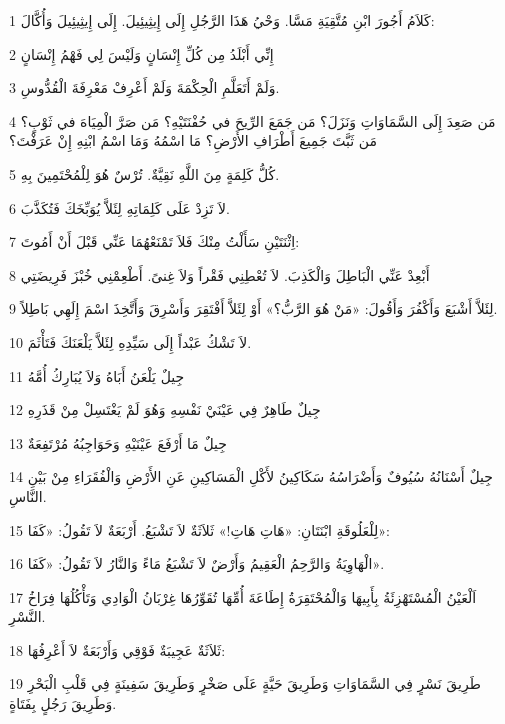\par 1 كَلاَمُ أَجُورَ ابْنِ مُتَّقِيَةِ مَسَّا. وَحْيُ هَذَا الرَّجُلِ إِلَى إِيثِيئِيلَ. إِلَى إِيثِيئِيلَ وَأُكَّالَ:
\par 2 إِنِّي أَبْلَدُ مِن كُلِّ إِنْسَانٍ وَلَيْسَ لِي فَهْمُ إِنْسَانٍ
\par 3 وَلَمْ أَتَعَلَّمِ الْحِكْمَةَ وَلَمْ أَعْرِفْ مَعْرِفَةَ الْقُدُّوسِ.
\par 4 مَن صَعِدَ إِلَى السَّمَاوَاتِ وَنَزَلَ؟ مَن جَمَعَ الرِّيحَ في حُفْنَتَيْهِ؟ مَن صَرَّ الْمِيَاهَ في ثَوْبٍ؟ مَن ثَبَّتَ جَمِيعَ أَطْرَافِ الأَرْضِ؟ مَا اسْمُهُ وَمَا اسْمُ ابْنِهِ إِنْ عَرَفْتَ؟
\par 5 كُلُّ كَلِمَةٍ مِنَ اللَّهِ نَقِيَّةٌ. تُرْسٌ هُوَ لِلْمُحْتَمِينَ بِهِ.
\par 6 لاَ تَزِدْ عَلَى كَلِمَاتِهِ لِئَلاَّ يُوَبِّخَكَ فَتُكَذَّبَ.
\par 7 اِثْنَتَيْنِ سَأَلْتُ مِنْكَ فَلاَ تَمْنَعْهُمَا عَنِّي قَبْلَ أَنْ أَمُوتَ:
\par 8 أَبْعِدْ عَنِّي الْبَاطِلَ وَالْكَذِبَ. لاَ تُعْطِنِي فَقْراً وَلاَ غِنىً. أَطْعِمْنِي خُبْزَ فَرِيضَتِي
\par 9 لِئَلاَّ أَشْبَعَ وَأَكْفُرَ وَأَقُولَ: «مَنْ هُوَ الرَّبُّ؟» أَوْ لِئَلاَّ أَفْتَقِرَ وَأَسْرِقَ وَأَتَّخِذَ اسْمَ إِلَهِي بَاطِلاً.
\par 10 لاَ تَشْكُ عَبْداً إِلَى سَيِّدِهِ لِئَلاَّ يَلْعَنَكَ فَتَأْثَمَ.
\par 11 جِيلٌ يَلْعَنُ أَبَاهُ وَلاَ يُبَارِكُ أُمَّهُ
\par 12 جِيلٌ طَاهِرٌ فِي عَيْنَيْ نَفْسِهِ وَهُوَ لَمْ يَغْتَسِلْ مِنْ قَذَرِهِ
\par 13 جِيلٌ مَا أَرْفَعَ عَيْنَيْهِ وَحَوَاجِبُهُ مُرْتَفِعَةٌ
\par 14 جِيلٌ أَسْنَانُهُ سُيُوفٌ وَأَضْرَاسُهُ سَكَاكِينُ لأَكْلِ الْمَسَاكِينِ عَنِ الأَرْضِ وَالْفُقَرَاءِ مِنْ بَيْنِ النَّاسِ.
\par 15 لِلْعَلُوقَةِ ابْنَتَانِ: «هَاتِ هَاتِ!» ثَلاَثَةٌ لاَ تَشْبَعُ. أَرْبَعَةٌ لاَ تَقُولُ: «كَفَا»:
\par 16 الْهَاوِيَةُ وَالرَّحِمُ الْعَقِيمُ وَأَرْضٌ لاَ تَشْبَعُ مَاءً وَالنَّارُ لاَ تَقُولُ: «كَفَا».
\par 17 اَلْعَيْنُ الْمُسْتَهْزِئَةُ بِأَبِيهَا وَالْمُحْتَقِرَةُ إِطَاعَةَ أُمِّهَا تُقَوِّرُهَا غِرْبَانُ الْوَادِي وَتَأْكُلُهَا فِرَاخُ النَّسْرِ.
\par 18 ثَلاَثَةٌ عَجِيبَةٌ فَوْقِي وَأَرْبَعَةٌ لاَ أَعْرِفُهَا:
\par 19 طَرِيقَ نَسْرٍ فِي السَّمَاوَاتِ وَطَرِيقَ حَيَّةٍ عَلَى صَخْرٍ وَطَرِيقَ سَفِينَةٍ فِي قَلْبِ الْبَحْرِ وَطَرِيقَ رَجُلٍ بِفَتَاةٍ.
